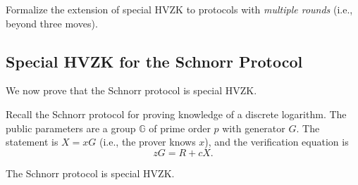 \documentclass[11pt]{article}
\begin{document}
\begin{remark}[Exercise]
Formalize the extension of special HVZK to protocols with
\emph{multiple rounds} (i.e., beyond three moves).
\end{remark}

\subsection{Special HVZK for the Schnorr Protocol}

We now prove that the Schnorr protocol is special HVZK.

Recall the Schnorr protocol for proving knowledge of a discrete
logarithm.  The public parameters are a group $\mathbb{G}$ of prime
order $p$ with generator $G$.  The statement is $X = xG$ (i.e.,
the prover knows $x$), and the verification equation is
\[
  zG = R + cX.
\]

\begin{theorem}
The Schnorr protocol is special HVZK.
\end{theorem}
\end{document}
